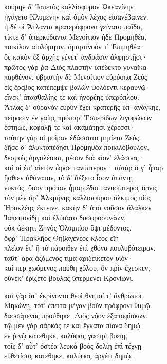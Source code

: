 \quad{}κούρην δ' Ἰαπετὸς καλλίσφυρον Ὠκεανίνην\\
ἠγάγετο Κλυμένην καὶ ὁμὸν λέχος εἰσανέβαινεν.\\
ἡ δέ οἱ Ἄτλαντα κρατερόφρονα γείνατο παῖδα,\\
τίκτε δ' ὑπερκύδαντα Μενοίτιον ἠδὲ Προμηθέα, \\
ποικίλον αἰολόμητιν, ἁμαρτίνοόν τ' Ἐπιμηθέα· \\
ὃς κακὸν ἐξ ἀρχῆς γένετ' ἀνδράσιν ἀλφηστῇσι· \\
πρῶτος γάρ ῥα Διὸς πλαστὴν ὑπέδεκτο γυναῖκα\\
παρθένον. ὑβριστὴν δὲ Μενοίτιον εὐρύοπα Ζεὺς\\
εἰς ἔρεβος κατέπεμψε βαλὼν ψολόεντι κεραυνῷ  \\
εἵνεκ' ἀτασθαλίης τε καὶ ἠνορέης ὑπερόπλου.\\
Ἄτλας δ' οὐρανὸν εὐρὺν ἔχει κρατερῆς ὑπ' ἀνάγκης, \\
πείρασιν ἐν γαίης πρόπαρ' Ἑσπερίδων λιγυφώνων \\
ἑστηώς, κεφαλῇ τε καὶ ἀκαμάτῃσι χέρεσσι· \\
ταύτην γάρ οἱ μοῖραν ἐδάσσατο μητίετα Ζεύς. \\
δῆσε δ' ἀλυκτοπέδῃσι Προμηθέα ποικιλόβουλον,\\
δεσμοῖς ἀργαλέοισι, μέσον διὰ κίον' ἐλάσσας· \\
καί οἱ ἐπ' αἰετὸν ὦρσε τανύπτερον· αὐτὰρ ὅ γ' ἧπαρ \\
ἤσθιεν ἀθάνατον, τὸ δ' ἀέξετο ἶσον ἁπάντῃ \\
νυκτός, ὅσον πρόπαν ἦμαρ ἔδοι τανυσίπτερος ὄρνις.  \\
τὸν μὲν ἄρ' Ἀλκμήνης καλλισφύρου ἄλκιμος υἱὸς\\
Ἡρακλέης ἔκτεινε, κακὴν δ' ἀπὸ νοῦσον ἄλαλκεν\\
Ἰαπετιονίδῃ καὶ ἐλύσατο δυσφροσυνάων, \\
οὐκ ἀέκητι Ζηνὸς Ὀλυμπίου ὕψι μέδοντος,\\
ὄφρ' Ἡρακλῆος Θηβαγενέος κλέος εἴη \\
πλεῖον ἔτ' ἢ τὸ πάροιθεν ἐπὶ χθόνα πουλυβότειραν.\\
ταῦτ' ἄρα ἁζόμενος τίμα ἀριδείκετον υἱόν·\\
καί περ χωόμενος παύθη χόλου, ὃν πρὶν ἔχεσκεν,\\
οὕνεκ' ἐρίζετο βουλὰς ὑπερμενέι Κρονίωνι.

\quad{}καὶ γὰρ ὅτ' ἐκρίνοντο θεοὶ θνητοί τ' ἄνθρωποι \\
Μηκώνῃ, τότ' ἔπειτα μέγαν βοῦν πρόφρονι θυμῷ\\
δασσάμενος προύθηκε, Διὸς νόον ἐξαπαφίσκων. \\
τῷ μὲν γὰρ σάρκάς τε καὶ ἔγκατα πίονα δημῷ \\
ἐν ῥινῷ κατέθηκε, καλύψας γαστρὶ βοείῃ,\\
τοῖς δ' αὖτ' ὀστέα λευκὰ βοὸς δολίῃ ἐπὶ τέχνῃ  \\
εὐθετίσας κατέθηκε, καλύψας ἀργέτι δημῷ. 

